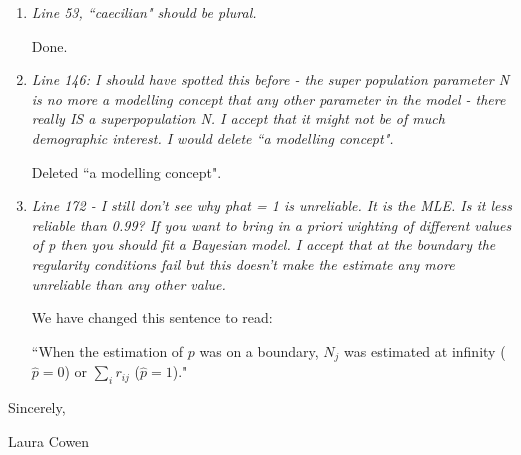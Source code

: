 \documentclass[12pt]{article}
\begin{document}
\begin{enumerate}
\item  {\it Line 53, ``caecilian" should be plural.}

Done.

\item  {\it Line 146: I should have spotted this before - the super population parameter N is no more a modelling concept that any other parameter in the model - there really IS a superpopulation N.  I accept that it might not be of much demographic interest.  I would delete ``a modelling concept".}

Deleted ``a modelling concept".


\item  {\it Line 172 - I still don't see why phat = 1 is unreliable.  It is the MLE. Is it less reliable than 0.99?  If you want to bring in a priori wighting of different values of p then you should fit a Bayesian model.  I accept that at the boundary the regularity conditions fail but this doesn't make the estimate any more unreliable than any other value.}

We have changed this sentence to read:

``When the estimation of $p$ was on a boundary, $N_j$ was estimated at infinity ($\hat{p}=0$) or $\sum_i r_{ij}$  ($\hat{p}=1$)."


\end{enumerate}


\noindent Sincerely,

\bigskip

\bigskip


\noindent Laura Cowen
\end{document}
